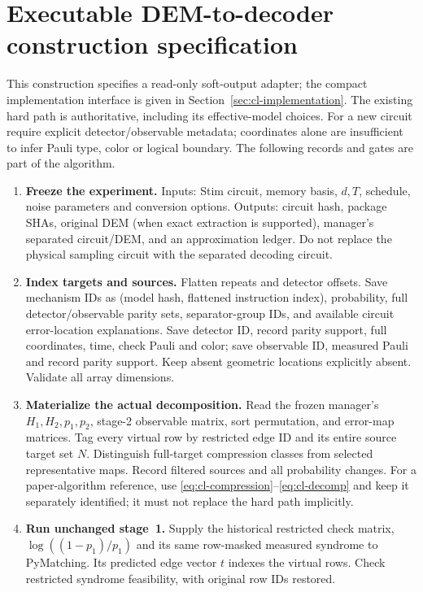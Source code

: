 \section{Executable DEM-to-decoder construction specification}
\label{sec:cl-algorithm}
This construction specifies a read-only soft-output adapter; the compact
implementation interface is given in Section~\ref{sec:cl-implementation}.
The existing hard path is authoritative, including its effective-model
choices. For a new circuit require explicit detector/observable metadata;
coordinates alone are insufficient to infer Pauli type, color or logical
boundary. The following records and gates are part of the algorithm.
\begin{enumerate}
\item \textbf{Freeze the experiment.} Inputs: Stim circuit, memory basis,
$d,T$, schedule, noise parameters and conversion options. Outputs: circuit
hash, package SHAs, original DEM (when exact extraction is supported),
manager's separated circuit/DEM, and an approximation ledger. Do not replace
the physical sampling circuit with the separated decoding circuit.
\item \textbf{Index targets and sources.} Flatten repeats and detector
offsets. Save mechanism IDs as (model hash, flattened instruction index),
probability, full detector/observable parity sets, separator-group IDs,
and available circuit error-location explanations. Save detector ID,
record parity support, full coordinates, time, check Pauli and color;
save observable ID, measured Pauli and record parity support. Keep absent
geometric locations explicitly absent. Validate all array dimensions.
\item \textbf{Materialize the actual decomposition.} Read the frozen
manager's $H_1,H_2,p_1,p_2$, stage-2 observable matrix, sort permutation,
and error-map matrices. Tag every virtual row by restricted edge ID and
its entire source target set $N$. Distinguish full-target compression
classes from selected representative maps. Record filtered sources and
all probability changes. For a paper-algorithm reference, use
\eqref{eq:cl-compression}--\eqref{eq:cl-decomp} and keep it separately
identified; it must not replace the hard path implicitly.
\item \textbf{Run unchanged stage~1.} Supply the historical restricted
check matrix, $\log((1-p_1)/p_1)$ and its same row-masked measured syndrome
to PyMatching. Its predicted edge vector $t$ indexes the virtual rows.
Check restricted syndrome feasibility, with original row IDs restored.

\end{enumerate}
